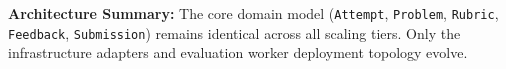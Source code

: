\documentclass[10pt,a4paper]{article}
\begin{document}
\begin{tcolorbox}
\textbf{Architecture Summary:} The core domain model (\texttt{Attempt}, \texttt{Problem}, \texttt{Rubric}, \texttt{Feedback}, \texttt{Submission}) remains identical across all scaling tiers. Only the infrastructure adapters and evaluation worker deployment topology evolve.
\end{tcolorbox}
\end{document}
